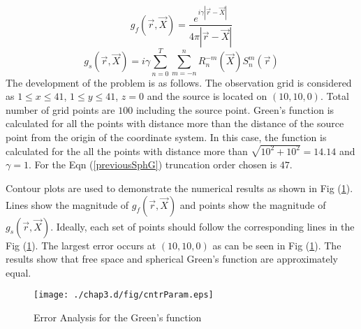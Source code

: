 \begin{equation}
\label{previousFreeSpG}
 g_f(\vec{r},\vec{X})=   \frac{e^{i\gamma|\vec{r}-\vec{X}|}}{4\pi|\vec{r}-\vec{X}|}  
\end{equation}   
\begin{equation}
\label{previousSphG}
  g_s(\vec{r},\vec{X}) =  i\gamma \sum_{n=0}^{T}\sum_{m= -n}^{n}R_{n}^{-m}(\vec{X}) S_{n}^{m}(\vec{r})
 \end{equation}
The development of the problem is as follows. The observation grid is considered as $ 1 \le x \le 41$, $1 \le y \le 41$, $z = 0$ and the source is  located on  $(10,10,0)$. Total number of grid points are $100$ including the source point.   Green's function is calculated for all the points with distance more than the distance  of the source point from the origin of the coordinate system.   In this case, the function is calculated for the all the points with distance more than $\sqrt{10^2+10^2}=14.14$ and  $\gamma=1$.  For the Eqn (\ref{previousSphG}) truncation order chosen is $47$. 
\par 
Contour plots are used to demonstrate the numerical results as shown  in Fig (\ref{cntrparam121111}). Lines show the magnitude of $g_f(\vec{r},\vec{X})$  and points show the magnitude of $g_s(\vec{r},\vec{X})$. Ideally, each set of points should follow the corresponding lines in the Fig (\ref{cntrparam121111}). The largest error occurs at $(10,10,0)$ as can be seen in Fig (\ref{cntrparam121111}).
The results show that free space and spherical Green's function are approximately equal.
\newpage
\begin{figure}[h!]
\begin{center}
\texttt{[image: ./chap3.d/fig/cntrParam.eps]}
\caption{Error Analysis for the Green's function }
\label{cntrparam121111}
\end{center}
\end{figure}



\newpage 
